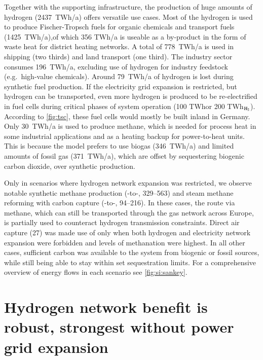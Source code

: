 Together with the supporting infrastructure, the production of huge amounts of
hydrogen (2437~TWh/a) offers versatile use cases. Most of the hydrogen is used
to produce Fischer-Tropsch fuels for organic chemicals and transport fuels
(1425~TWh/a),of which 356 TWh/a is useable as a by-product in the form of waste
heat for district heating networks. A total of 778~TWh/a is used in shipping
(two thirds) and land transport (one third). The industry sector consumes
196~TWh/a, excluding use of hydrogen for industry feedstock (e.g.~high-value
chemicals). Around 79~TWh/a of hydrogen is lost during synthetic fuel
production. If the electricity grid expansion is restricted, but hydrogen can be
transported, even more hydrogen is produced to be re-electrified in fuel cells
during critical phases of system operation (100 TWh\el or 200 TWh$_{\ce{H2}}$).
According to \cref{fig:tsc}, these fuel cells would mostly be built inland in
Germany. Only 30~TWh/a is used to produce methane, which is needed for process
heat in some industrial applications and as a heating backup for power-to-heat
units. This is because the model prefers to use biogas (346~TWh/a) and limited
amounts of fossil gas (371~TWh/a), which are offset by sequestering biogenic
carbon dioxide, over synthetic production.

Only in scenarios where hydrogen network expansion was restricted, we observe
notable synthetic methane production (-to-,
\SIrange{329}{563}{\twh}) and steam methane reforming with carbon capture
(-to-, \SIrange{94}{216}{\twh}). In these cases, the route via
methane, which can still be transported through the gas network across Europe,
is partially used to counteract hydrogen transmission constraints. Direct air
capture (\SI{27}{\tco}) was made use of only when both hydrogen and electricity
network expansion were forbidden and levels of methanation were highest. In all
other cases, sufficient carbon was available to the system from biogenic or
fossil sources, while still being able to stay within set sequestration limits.
For a comprehensive overview of energy flows in each scenario see
\cref{fig:si:sankey}.

\section*{Hydrogen network benefit is robust, strongest without power grid expansion}
\label{sec:h2}


